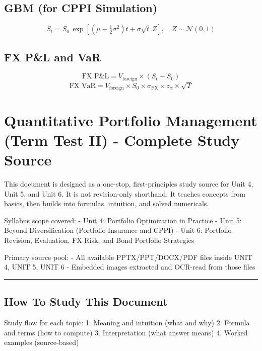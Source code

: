 \documentclass[
]{article}
\begin{document}
\subsection{GBM (for CPPI Simulation)}
\[
S_t = S_0\,\exp\!\left[\left(\mu - \tfrac{1}{2}\sigma^2\right)t + \sigma\sqrt{t}\,Z\right],
\quad Z\sim\mathcal{N}(0,1)
\]

\subsection{FX P\&L and VaR}
\[
\text{FX P\&L} = V_{\text{foreign}}\times(S_t - S_0)
\]
\[
\text{FX VaR} = V_{\text{foreign}}\times S_0\times\sigma_{\text{FX}}\times z_\alpha\times\sqrt{T}
\]

\hypertarget{quantitative-portfolio-management-term-test-ii---complete-study-source}{%
\section{Quantitative Portfolio Management (Term Test II) - Complete
Study
Source}\label{quantitative-portfolio-management-term-test-ii---complete-study-source}}

This document is designed as a one-stop, first-principles study source
for Unit 4, Unit 5, and Unit 6. It is not revision-only shorthand. It
teaches concepts from basics, then builds into formulas, intuition, and
solved numericals.

Syllabus scope covered: - Unit 4: Portfolio Optimization in Practice -
Unit 5: Beyond Diversification (Portfolio Insurance and CPPI) - Unit 6:
Portfolio Revision, Evaluation, FX Risk, and Bond Portfolio Strategies

Primary source pool: - All available PPTX/PPT/DOCX/PDF files inside UNIT
4, UNIT 5, UNIT 6 - Embedded images extracted and OCR-read from those
files

\begin{center}\rule{0.5\linewidth}{0.5pt}\end{center}

\hypertarget{how-to-study-this-document}{%
\subsection{How To Study This
Document}\label{how-to-study-this-document}}

Study flow for each topic: 1. Meaning and intuition (what and why) 2.
Formula and terms (how to compute) 3. Interpretation (what answer means)
4. Worked examples (source-based)
\end{document}

